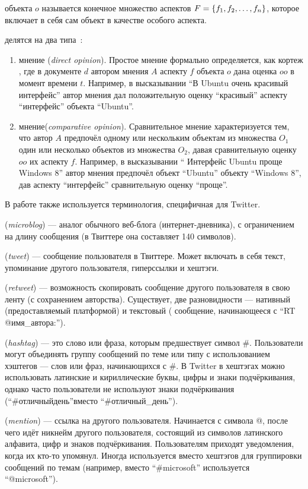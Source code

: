 { объекта} $o$ называется конечное множество аспектов 
$F = \left \{ f_1, f_2, \ldots , f_n \right \}$, которое включает в себя сам объект в качестве 
особого аспекта.

{} делятся на два типа~\cite{Liu2010}:
\begin{enumerate}

\item{
  {} мнение (\textit{direct opinion}). Простое мнение формально 
  определяется, как кортеж , где в документе $d$ автором 
  мнения $A$ аспекту $f$ объекта $o$ дана оценка $oo$ в момент времени $t$. 
  Например, в высказывании ``В Ubuntu очень красивый интерфейс'' автор мнения 
  дал положительную оценку ``красивый'' аспекту ``интерфейс'' объекта ``Ubuntu''.
}

\item{
  {} мнение(\textit{comparative opinion}). Сравнительное мнение 
  характеризуется тем, что автор $A$ предпочёл одному или нескольким объектам 
  из множества $O_1$ один или несколько объектов из множества $O_2$, давая 
  сравнительную оценку $oo$ их аспекту $f$. Например, в высказывании ``
  Интерфейс Ubuntu проще Windows 8'' автор мнения предпочёл объект ``Ubuntu'' 
  объекту ``Windows 8'', дав аспекту ``интерфейс'' сравнительную оценку ``проще''. 
}

\end{enumerate}

В работе также используется терминология, специфичная для Twitter.

{} (\textit{microblog}) --- аналог обычного веб-блога 
(интернет-дневника), с ограничением на длину сообщения (в Твиттере она 
составляет 140 символов). 

{} (\textit{tweet}) --- сообщение пользователя в Твиттере. Может включать в 
себя текст, упоминание другого пользователя, гиперссылки и хештэги.

{} (\textit{retweet}) --- возможность скопировать сообщение другого 
пользователя в свою ленту (с сохранением авторства). Существует, две 
разновидности --- нативный (предоставляемый платформой) и текстовый (
сообщение, начинающееся с ``RT @имя\_автора:'').

{} (\textit{hashtag}) --- это слово или фраза, которым предшествует 
символ \#. Пользователи могут объединять группу сообщений по теме или типу с 
использованием хэштегов — слов или фраз, начинающихся с \#. В Twitter в 
хештэгах можно использовать латинские и кириллические буквы, цифры и знаки 
подчёркивания, однако часто пользователи не используют знаки подчёркивания (``\#отличныйдень''вместо ``\#отличный\_день'').

{} (\textit{mention}) --- ссылка на другого пользователя.  Начинается 
с символа @, после чего идёт никнейм другого пользователя, состоящий из 
символов латинского алфавита, цифр и знаков подчёркивания. Пользователям 
приходят уведомления, когда их кто-то упомянул. Иногда используется вместо 
хештэгов для группировки сообщений по темам (например, вместо ``\#microsoft'' 
используется ``@microsoft'').